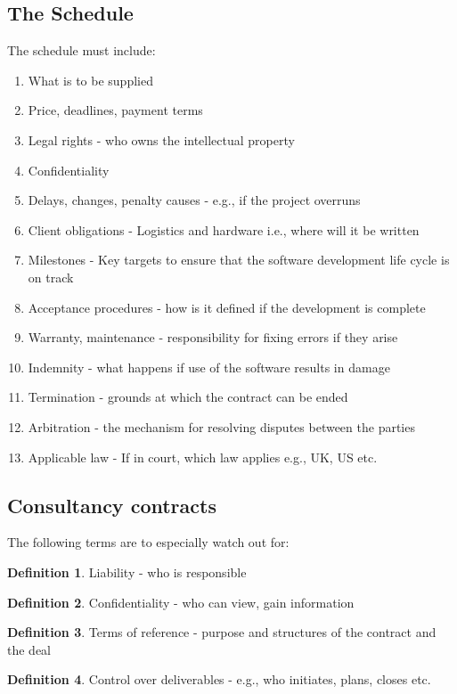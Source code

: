\documentclass[a4paper]{article}
\theoremstyle{plain}
\theoremstyle{definition}
\newtheorem{defn}{Definition}[section]
\theoremstyle{remark}
\begin{document}
\subsection{The Schedule}
The schedule must include:
\begin{enumerate}
	\item What is to be supplied
	\item Price, deadlines, payment terms
	\item Legal rights - who owns the intellectual property
	\item Confidentiality
	\item Delays, changes, penalty causes - e.g., if the project overruns
	\item Client obligations - Logistics and hardware i.e., where will it be written
	\item Milestones - Key targets to ensure that the software development life cycle is on track
	\item Acceptance procedures - how is it defined if the development is complete
	\item Warranty, maintenance - responsibility for fixing errors if they arise
	\item Indemnity - what happens if use of the software results in damage
	\item Termination - grounds at which the contract can be ended
	\item Arbitration - the mechanism for resolving disputes between the parties
	\item Applicable law - If in court, which law applies e.g., UK, US etc.
\end{enumerate}

\subsection{Consultancy contracts}
The following terms are to especially watch out for:
\begin{defn}
	Liability - who is responsible
\end{defn}
\begin{defn}
	Confidentiality - who can view, gain information
\end{defn}
\begin{defn}
	Terms of reference - purpose and structures of the contract and the deal
\end{defn}
\begin{defn}
	Control over deliverables - e.g., who initiates, plans, closes etc.
\end{defn}
\end{document}
